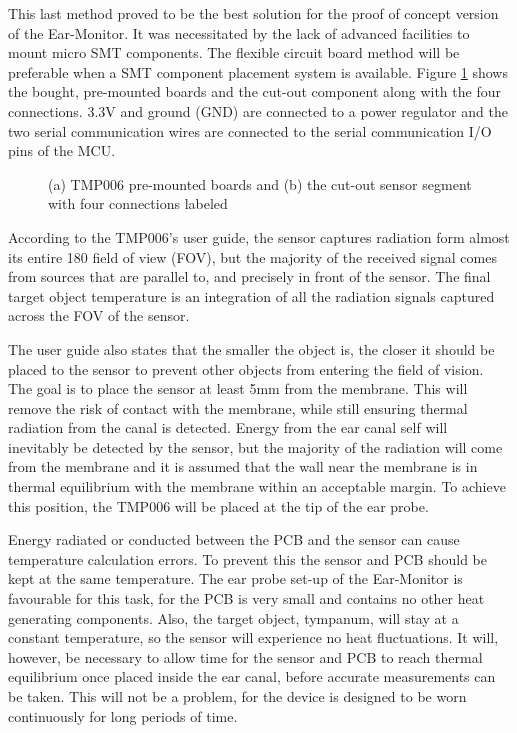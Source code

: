 \medskip

This last method proved to be the best solution for the proof of concept version of the Ear-Monitor. It was necessitated by the lack of advanced facilities to mount micro SMT components. The flexible circuit board method will be preferable when a SMT component placement system is available. Figure \ref{fig:TMP006_Breakout} shows the bought, pre-mounted boards and the cut-out component along with the four connections. 3.3V and ground (GND) are connected to a power regulator and the two serial communication wires are connected to the serial communication I/O pins of the MCU.

\begin{figure}[h]
\centering
\graphicspath{{figs/}}

\caption{(a) TMP006 pre-mounted boards and (b) the cut-out sensor segment with four connections labeled}
\label{fig:TMP006_Breakout}
\end{figure}

According to the TMP006's user guide, the sensor captures radiation form almost its entire 180\textdegree{} field of view (FOV), but the majority of the received signal comes from sources that are parallel to, and precisely in front of the sensor. The final target object temperature is an integration of all the radiation signals captured across the FOV of the sensor.

\medskip

The user guide also states that the smaller the object is, the closer it should be placed to the sensor to prevent other objects from entering the field of vision. The goal is to place the sensor at least 5mm from the membrane. This will remove the risk of contact with the membrane, while still ensuring thermal radiation from the canal is detected. Energy from the ear canal self will inevitably be detected by the sensor, but the majority of the radiation will come from the membrane and it is assumed that the wall near the membrane is in thermal equilibrium with the membrane within an acceptable margin. To achieve this position, the TMP006 will be placed at the tip of the ear probe.

\medskip

Energy radiated or conducted between the PCB and the sensor can cause temperature calculation errors. To prevent this the sensor and PCB should be kept at the same temperature. The ear probe set-up of the Ear-Monitor is favourable for this task, for the PCB is very small and contains no other heat generating components. Also, the target object, tympanum, will stay at a constant temperature, so the sensor will experience no heat fluctuations. It will, however, be necessary to allow time for the sensor and PCB to reach thermal equilibrium once placed inside the ear canal, before accurate measurements can be taken. This will not be a problem, for the device is designed to be worn continuously for long periods of time.

